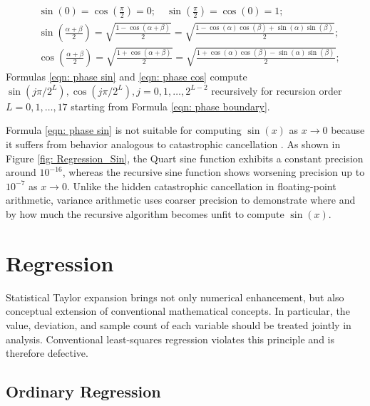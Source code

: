 \documentclass[twoside]{article}
\numberwithin{equation}{section}
\begin{document}
\begin{align}
\label{eqn: phase boundary}
& \sin(0) = \cos(\frac{\pi}{2}) = 0;\quad \sin(\frac{\pi}{2}) = \cos(0) = 1; \\
\label{eqn: phase sin}
& \sin(\frac{\alpha + \beta}{2}) = \sqrt{\frac{1 - \cos(\alpha + \beta)}{2}} = \sqrt{\frac{1 - \cos(\alpha) \cos(\beta) + \sin(\alpha) \sin(\beta)}{2}}; \\
\label{eqn: phase cos}
& \cos(\frac{\alpha + \beta}{2}) = \sqrt{\frac{1 + \cos(\alpha + \beta)}{2}} = \sqrt{\frac{1 + \cos(\alpha) \cos(\beta) - \sin(\alpha) \sin(\beta)}{2}};
\end{align}
Formulas \eqref{eqn: phase sin} and \eqref{eqn: phase cos} compute $\sin(j \pi/2^L), \cos(j \pi/2^L), j = 0, 1, \dots, 2^{L - 2}$ recursively for recursion order $L = 0, 1, \dots, 17$ starting from Formula \eqref{eqn: phase boundary}.

Formula \eqref{eqn: phase sin} is not suitable for computing $\sin(x)$ as $x \rightarrow 0$ because it suffers from behavior analogous to catastrophic cancellation \cite{Rounding_Error, Precise_Numerical_Methods}.
As shown in Figure \ref{fig: Regression_Sin}, the Quart sine function exhibits a constant precision around $10^{-16}$, whereas the recursive sine function shows worsening precision up to $10^{-7}$ as $x \rightarrow 0$.
Unlike the hidden catastrophic cancellation in floating-point arithmetic, variance arithmetic uses coarser precision to demonstrate where and by how much the recursive algorithm becomes unfit to compute $\sin(x)$.




\section{Regression}
\label{sec: regression}

Statistical Taylor expansion brings not only numerical enhancement, but also conceptual extension of conventional mathematical concepts.
In particular, the value, deviation, and sample count of each variable should be treated jointly in analysis.
Conventional least-squares regression \cite{Statistical_Methods, Probability_Statistics, Numerical_Recipes} violates this principle and is therefore defective.

\subsection{Ordinary Regression}
\end{document}
